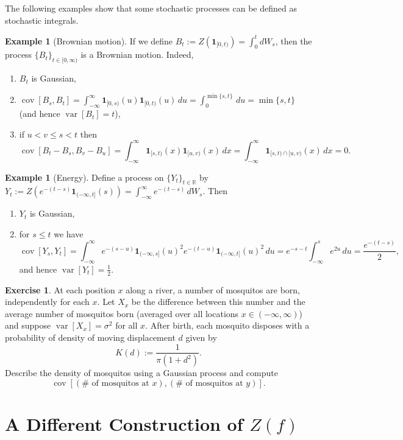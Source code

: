 \documentclass{article}
\newcommand{\R}{\mathbb{R}}    %
\DeclareMathOperator{\var}{var}
\DeclareMathOperator{\cov}{cov}
\theoremstyle{definition}
\newtheorem{exmp}[thm]{Example}
\newtheorem{exer}[thm]{Exercise}
\begin{document}
The following examples show that some stochastic processes can be defined as stochastic integrals.

\begin{exmp}[Brownian motion] If we define $B_t:=Z(\mathbf{1}_{[0,t)})=\int_0^tdW_s$, then the process $\{B_t\}_{t\in[0,\infty)}$ is a Brownian motion. Indeed,
\begin{enumerate}[label=(\roman*)]
\item $B_t$ is Gaussian,
\item $\cov[B_s,B_t]=\int_{-\infty}^\infty\mathbf{1}_{[0,s)}(u)\mathbf{1}_{[0,t)}(u)\,du=\int_0^{\min\{s,t\}}\,du=\min\{s,t\}$ (and hence $\var[B_t]=t$),
\item if $u<v\leq s<t$ then $$\cov[B_t-B_s,B_v-B_u]=\int_{-\infty}^\infty\mathbf{1}_{[s,t)}(x)\mathbf{1}_{[u,v)}(x)\,dx=\int_{-\infty}^\infty\mathbf{1}_{[s,t)\cap[u,v)}(x)\,dx=0.$$
\end{enumerate}
\end{exmp}

\begin{exmp}[Energy]
Define a process on $\{Y_t\}_{t\in\R}$ by $Y_t:=Z\left(e^{-(t-s)}\mathbf{1}_{(-\infty,t]}(s)\right)=\int_{-\infty}^\infty e^{-(t-s)}\,dW_s.$ Then
\begin{enumerate}[label=(\roman*)]
\item $Y_t$ is Gaussian,
\item for $s\leq t$ we have $$\cov[Y_s,Y_t]=\int_{-\infty}^\infty e^{-(s-u)}\mathbf{1}_{(-\infty,s]}(u)^2e^{-(t-u)}\mathbf{1}_{(-\infty,t]}(u)^2\,du=e^{-s-t}\int_{-\infty}^se^{2u}\,du=\frac{e^{-(t-s)}}{2},$$ and hence $\var[Y_t]=\frac{1}{2}$.
\end{enumerate}
\end{exmp}

\begin{exer}
At each position $x$ along a river, a number of mosquitos are born, independently for each $x$. Let $X_x$ be the difference between this number and the average number of mosquitos born (averaged over all locations $x\in(-\infty,\infty)$) and suppose $\var[X_x]=\sigma^2$ for all $x$. After birth, each mosquito disposes with a probability of density of moving displacement $d$ given by $$K(d):=\frac{1}{\pi(1+d^2)}.$$ Describe the density of mosquitos using a Gaussian process and compute $$\cov[(\#\text{ of mosquitos at }x),(\#\text{ of mosquitos at }y)].$$
\end{exer}


\section{A Different Construction of $Z(f)$}
\end{document}
